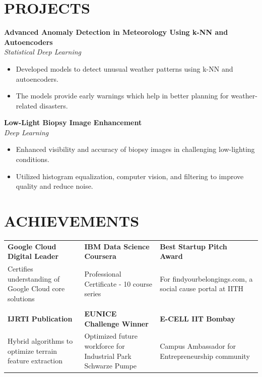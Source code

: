 \documentclass[a4paper,11pt]{article}
\newcommand{\safehref}[2]{#2}
\let\href\safehref
\newcommand{\extlink}{\raisebox{0.2ex}{\scriptsize\faExternalLink*}}
\begin{document}
\section*{PROJECTS}
\sloppy
\noindent\textbf{\href{https://example.com}{Advanced Anomaly Detection in Meteorology Using k-NN and Autoencoders\ \extlink}}\\
\textit{Statistical Deep Learning}
\begin{itemize}
  \item Developed models to detect unusual weather patterns using k-NN and autoencoders.
  \item The models provide early warnings which help in better planning for weather-related disasters.
\end{itemize}

\vspace{0.15cm}
\noindent\textbf{\href{https://example.com}{Low-Light Biopsy Image Enhancement\ \extlink}}\\
\textit{Deep Learning}
\begin{itemize}
  \item Enhanced visibility and accuracy of biopsy images in challenging low-lighting conditions.
  \item Utilized histogram equalization, computer vision, and filtering to improve quality and reduce noise.
\end{itemize}
\fussy

\section*{ACHIEVEMENTS}
{\small
\setlength{\tabcolsep}{8pt}
\renewcommand{\arraystretch}{1.15}
\begin{tabularx}{\textwidth}{@{}>{\RaggedRight\arraybackslash}X >{\RaggedRight\arraybackslash}X >{\RaggedRight\arraybackslash}X@{}}
  \textbf{\href{https://example.com}{Google Cloud Digital Leader\ \extlink}} &
  \textbf{\href{https://example.com}{IBM Data Science Coursera\ \extlink}} &
  \textbf{\href{https://example.com}{Best Startup Pitch Award\ \extlink}} \\
  Certifies understanding of Google Cloud core solutions &
  Professional Certificate - 10 course series &
  For findyourbelongings.com, a social cause portal at IITH \\
  \\[-2pt]
  \textbf{\href{https://example.com}{IJRTI Publication\ \extlink}} &
  \textbf{\href{https://example.com}{EUNICE Challenge Winner\ \extlink}} &
  \textbf{\href{https://example.com}{E-CELL IIT Bombay\ \extlink}} \\
  Hybrid algorithms to optimize terrain feature extraction &
  Optimized future workforce for Industrial Park Schwarze Pumpe &
  Campus Ambassador for Entrepreneurship community \\
\end{tabularx}
}
\end{document}
